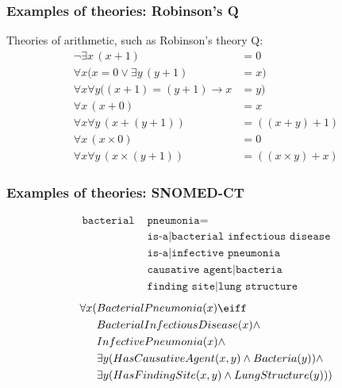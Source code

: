 \begin{frame}
    \frametitle{Examples of theories: Robinson's Q}

Theories of arithmetic, such as Robinson's theory Q:
\begin{align*}
 \lnot\exists x\, (x + 1) & = 0\\
 \forall x(x = 0  \lor \exists y\, (y+1) & = x)\\
 \forall x\forall y((x + 1) = (y + 1)  \to x & = y)\\
 \forall x\,(x + 0) & = x\\
 \forall x\forall y\, (x + (y+1)) & = ((x + y) +1) \\
 \forall x\,(x \times 0) & = 0\\
 \forall x\forall y\, (x \times (y + 1)) & = ((x \times y) + x)
\end{align*}
\end{frame}



\begin{frame}
    \frametitle{Examples of theories: SNOMED-CT}

\begin{align*}
\texttt{bacterial } & \texttt{pneumonia} = \\
& \texttt{is-a|bacterial infectious disease}\\
& \texttt{is-a|infective pneumonia}\\
& \texttt{causative agent|bacteria}\\
& \texttt{finding site|lung structure}
\end{align*}
\begin{align*}
\forall x(& BacterialPneumonia(x) \eiff  \\
& BacterialInfectiousDisease(x) \land\\
& InfectivePneumonia(x) \land \\
& \exists y(HasCausativeAgent(x, y) \land Bacteria(y)) \land\\
&\exists y(HasFindingSite(x, y) \land LungStructure(y)))
\end{align*}
\end{frame}

